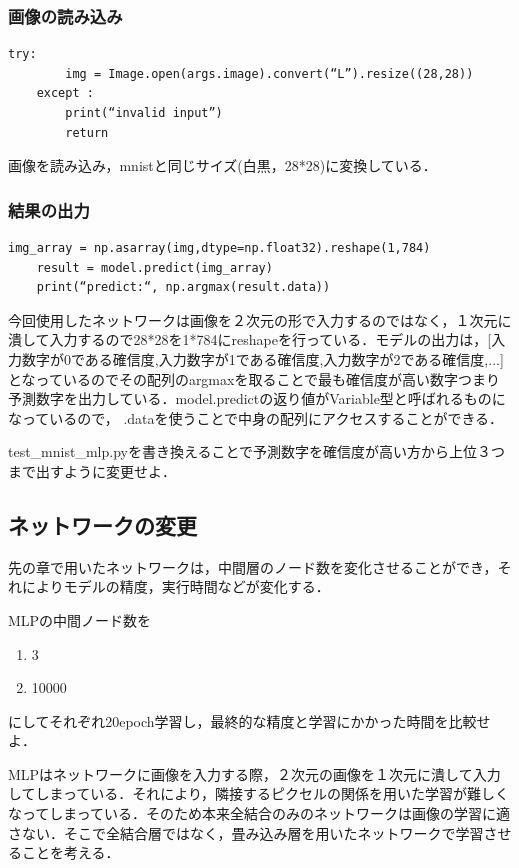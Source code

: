  \subsubsection{画像の読み込み}
\begin{lstlisting}[basicstyle=\ttfamily\footnotesize, frame=single]
    try:
        img = Image.open(args.image).convert(“L”).resize((28,28))
    except :
        print(“invalid input”)
        return
\end{lstlisting}
画像を読み込み，mnistと同じサイズ(白黒，28*28)に変換している．

\subsubsection{結果の出力}
\begin{lstlisting}[basicstyle=\ttfamily\footnotesize, frame=single]
    img_array = np.asarray(img,dtype=np.float32).reshape(1,784)
    result = model.predict(img_array)
    print(“predict:“, np.argmax(result.data))
\end{lstlisting}
今回使用したネットワークは画像を２次元の形で入力するのではなく，１次元に潰して入力するので28*28を1*784にreshapeを行っている．モデルの出力は，[入力数字が0である確信度,入力数字が1である確信度,入力数字が2である確信度,...]となっているのでその配列のargmaxを取ることで最も確信度が高い数字つまり予測数字を出力している．model.predictの返り値がVariable型と呼ばれるものになっているので，
.dataを使うことで中身の配列にアクセスすることができる．
\begin{practice}
test\_mnist\_mlp.pyを書き換えることで予測数字を確信度が高い方から上位３つまで出すように変更せよ．
\end{practice}

\subsection{ネットワークの変更}

先の章で用いたネットワークは，中間層のノード数を変化させることができ，それによりモデルの精度，実行時間などが変化する．
\begin{practice}
MLPの中間ノード数を
\begin{enumerate}
\item 3
\item 10000
\end{enumerate}
にしてそれぞれ20epoch学習し，最終的な精度と学習にかかった時間を比較せよ．
\end{practice}

MLPはネットワークに画像を入力する際，２次元の画像を１次元に潰して入力してしまっている．それにより，隣接するピクセルの関係を用いた学習が難しくなってしまっている．そのため本来全結合のみのネットワークは画像の学習に適さない．そこで全結合層ではなく，畳み込み層を用いたネットワークで学習させることを考える．

